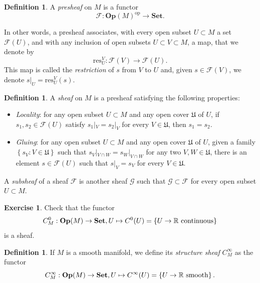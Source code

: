 \documentclass[11pt,a4paper]{book}
\theoremstyle{remark} \newtheorem{rmk}[thm]{Remark}
\theoremstyle{definition} \newtheorem{defn}[thm]{Definition}
\theoremstyle{definition} \newtheorem{ex}[thm]{Example}
\theoremstyle{definition} \newtheorem{ej}[thm]{Exercise}
\begin{document}
\begin{defn}
  A \emph{presheaf} on $M$ is a functor
  \begin{equation*}
    \mathscr{F}: \mathbf{Op}(M)^{\mathrm{op}}\rightarrow \mathbf{Set}.
  \end{equation*}

\end{defn}

In other words, a presheaf associates, with every open subset $U\subset M$ a set $\mathscr{F}(U)$, and with any inclusion of open subsets $U\subset V\subset M$, a map, that we denote by
\begin{equation*}
\mathrm{res}^V_U : \mathscr{F}(V) \rightarrow \mathscr{F}(U).
\end{equation*}
This map is called the \emph{restriction} of $s$ from $V$ to $U$ and, given $s\in \mathscr{F}(V)$, we denote $s|_U=\mathrm{res}^V_U (s)$.

\begin{defn}
  A \emph{sheaf} on $M$ is a presheaf satisfying the following properties:
  \begin{itemize}
  \item \emph{Locality}: for any open subset $U\subset M$ and any open cover $\mathfrak{U}$ of $U$, if $s_1,s_2 \in \mathscr{F}(U)$ satisfy $s_1|_V = s_2|_V$ for every $V\in \mathfrak{U}$, then $s_1=s_2$.
  \item \emph{Gluing}: for any open subset $U\subset M$ and any open cover $\mathfrak{U}$ of $U$, given a family $\left\{ s_V:V\in \mathfrak{U} \right\}$ such that $s_V|_{V\cap W}=s_W|_{V\cap W}$ for any two $V,W \in \mathfrak{U}$, there is an element $s\in \mathscr{F}(U)$ such that $s|_V=s_V$ for every $V\in \mathfrak{U}$.
  \end{itemize}

  A \emph{subsheaf} of a sheaf $\mathscr{F}$ is another sheaf $\mathscr{G}$ such that $\mathscr{G}\subset \mathscr{F}$ for every open subset $U\subset M$.
\end{defn}

\begin{ej}
Check that the functor
  \begin{equation*}
    C^0_M: \mathbf{Op}(M)\rightarrow \mathbf{Set}, U\mapsto C^0(U)=\left\{ U\rightarrow \mathbb R \text{ continuous} \right\}
  \end{equation*}
  is a sheaf.
\end{ej}

\begin{defn}
If $M$ is a smooth manifold, we define its \emph{structure sheaf} $C^\infty_M$ as the functor
  \begin{equation*}
    C^\infty_M: \mathbf{Op}(M)\rightarrow \mathbf{Set}, U\mapsto C^\infty(U)= \left\{ U\rightarrow \mathbb R \text{ smooth} \right\}.
  \end{equation*}
\end{defn}
\end{document}
